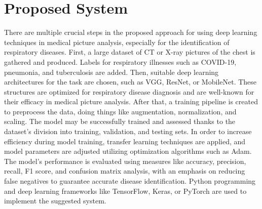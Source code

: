 \section{Proposed System}
There are multiple crucial steps in the proposed approach for using deep learning techniques in medical picture analysis, especially for the identification of respiratory diseases. First, a large dataset of CT or X-ray pictures of the chest is gathered and produced. Labels for respiratory illnesses such as COVID-19, pneumonia, and tuberculosis are added. Then, suitable deep learning architectures for the task are chosen, such as VGG, ResNet, or MobileNet. These structures are optimized for respiratory disease diagnosis and are well-known for their efficacy in medical picture analysis. After that, a training pipeline is created to preprocess the data, doing things like augmentation, normalization, and scaling. The model may be successfully trained and assessed thanks to the dataset's division into training, validation, and testing sets. In order to increase efficiency during model training, transfer learning techniques are applied, and model parameters are adjusted utilizing optimization algorithms such as Adam. The model's performance is evaluated using measures like accuracy, precision, recall, F1 score, and confusion matrix analysis, with an emphasis on reducing false negatives to guarantee accurate disease identification. Python programming and deep learning frameworks like TensorFlow, Keras, or PyTorch are used to implement the suggested system. 
